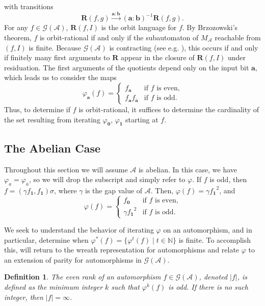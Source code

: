 \documentclass[12pt, letterpaper]{article}
\newcommand{\N}{\mathbb N}
\newcommand{\A}{\mathcal A}
\newcommand{\ch}[1]{\mathbf{#1}}
\newcommand{\res}[2]{{{#1}_{\ch{#2}}}}
\newcommand{\gp}{\mathcal G}
\newcommand{\R}{\mathbf R}
\newcommand{\f}[1]{\overline{#1}}
\newcommand{\rk}[1]{\left|#1\right|}
\newtheorem{defn}[thm]{Definition}
\begin{document}
with transitions
\[
    \R(f, g) \xrightarrow{\ch{a} {:} \ch{b}} (\ch{a} {:} \ch{b})^{-1} \R(f,g).
\]
For any $f \in \gp(\A)$, $\R(f, I)$ is the orbit language for $f$. By
Brzozowski's theorem, $f$ is orbit-rational if and only if the subautomaton of
$M_\A$ reachable from $(f, I)$ is finite. Because $\gp(\A)$ is contracting (see
e.g. \cite{nekrashevych2014self}), this occurs if and only if finitely many
first arguments to $\R$ appear in the closure of $\R(f, I)$ under residuation.
The first arguments of the quotients depend only on the input bit $\ch{a}$,
which leads us to consider the maps
\[
    \varphi_{\ch{a}}(f) = \begin{cases}
        \res{f}{a} & \text{if $f$ is even,}\\
        \res{f}{a}\res{f}{\f{a}} & \text{if $f$ is odd.}
    \end{cases}
\]
Thus, to determine if $f$ is orbit-rational, it suffices to determine the
cardinality of the set resulting from iterating $\varphi_{\ch{0}}$,
$\varphi_{\ch{1}}$ starting at $f$.


\subsection{The Abelian Case}\label{sec:abelian-orbit}
Throughout this section we will assume $\A$ is abelian. In this case, we have
$\varphi_a = \varphi_{\f{a}}$, so we will drop the subscript and simply refer
to $\varphi$. If $f$ is odd, then $f = (\gamma \res{f}{1}, \res{f}{1}) \sigma$,
where $\gamma$ is the gap value of $\A$.  Then, $\varphi(f) = \gamma
\res{f}{1}^2$, and
\begin{equation}\label{eq:abelianorbitresid}
    \varphi(f) = \begin{cases}
        \res{f}{0} & \text{if $f$ is even,}\\
        \gamma \res{f}{1}^2 & \text{if $f$ is odd.}
    \end{cases}
\end{equation}

We seek to understand the behavior of iterating $\varphi$ on an automorphism,
and in particular, determine when $\varphi^*(f) = \{\varphi^t (f) \mid t \in
\N\}$ is finite.  To accomplish this, will return to the wreath representation
for automorphisms and relate $\varphi$ to an extension of parity for
automorphisms in $\gp(\A)$.

\begin{defn}
    The even rank of an automorphism $f \in \gp(\A)$, denoted $\rk{f}$, is
    defined as the minimum integer $k$ such that $\varphi^k(f)$ is odd. If
    there is no such integer, then $\rk{f} = \infty$.
\end{defn}
\end{document}
